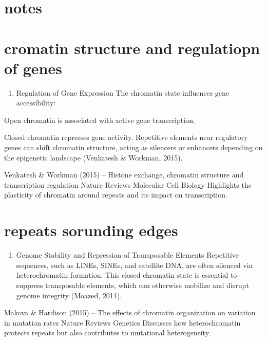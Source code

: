 \documentclass[
  a4paper,
]{scrbook}
\providecommand{\tightlist}{%
  \setlength{\itemsep}{0pt}\setlength{\parskip}{0pt}}
\begin{document}
\chapter{notes}\label{notes}

\chapter{cromatin structure and regulatiopn of
genes}\label{cromatin-structure-and-regulatiopn-of-genes}

\begin{enumerate}
\def\labelenumi{\arabic{enumi}.}
\setcounter{enumi}{1}
\tightlist
\item
  Regulation of Gene Expression The chromatin state influences gene
  accessibility:
\end{enumerate}

Open chromatin is associated with active gene transcription.

Closed chromatin represses gene activity. Repetitive elements near
regulatory genes can shift chromatin structure, acting as silencers or
enhancers depending on the epigenetic landscape (Venkatesh \& Workman,
2015).

Venkatesh \& Workman (2015) -- Histone exchange, chromatin structure and
transcription regulation Nature Reviews Molecular Cell Biology
Highlights the plasticity of chromatin around repeats and its impact on
transcription.

\chapter{repeats sorunding edges}\label{repeats-sorunding-edges}

\begin{enumerate}
\def\labelenumi{\arabic{enumi}.}
\tightlist
\item
  Genome Stability and Repression of Transposable Elements Repetitive
  sequences, such as LINEs, SINEs, and satellite DNA, are often silenced
  via heterochromatin formation. This closed chromatin state is
  essential to suppress transposable elements, which can otherwise
  mobilize and disrupt genome integrity (Moazed, 2011).
\end{enumerate}

Makova \& Hardison (2015) -- The effects of chromatin organization on
variation in mutation rates Nature Reviews Genetics Discusses how
heterochromatin protects repeats but also contributes to mutational
heterogeneity.
\end{document}
